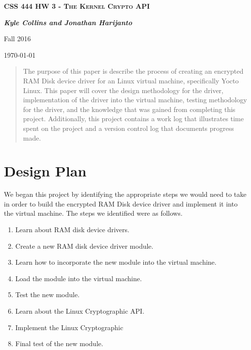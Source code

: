 \documentclass[letterpaper,10pt,draftclsnofoot,titlepage,onecolumn]{IEEEtran}
\begin{document}
	
	\begin{titlepage}
		\centering
		{\scshape\LARGE \textbf{CSS 444 HW 3 - The Kernel Crypto API}\par}
		{\LARGE\itshape \textbf{Kyle Collins and Jonathan Harijanto}\par}
		{\LARGE Fall 2016\par}
		{\LARGE \today\par}
		
	\vfill		
		
		\begin{abstract}
The purpose of this paper is describe the process of creating an encrypted RAM Disk device driver for an Linux virtual machine, specifically Yocto Linux. 
This paper will cover the design methodology for the driver, implementation of the driver into the virtual machine, testing methodology for the driver, and the knowledge that was gained from completing this project. 
Additionally, this project contains a work log that illustrates time spent on the project and a version control log that documents progress made.
 		\end{abstract}
		
	\end{titlepage}
	
	\clearpage
	\tableofcontents
	
	\clearpage
	\section{Design Plan}
	
We began this project by identifying the appropriate steps we would need to take in order to build the encrypted RAM Disk device driver and implement it into the virtual machine. 
The steps we identified were as follows.
 	 
 	 \begin{enumerate}
 	 	\item Learn about RAM disk device drivers.
 	 	\item Create a new RAM disk device driver module. 
 	 	\item Learn how to incorporate the new module into the virtual machine.
 	 	\item Load the module into the virtual machine.
 		\item Test the new module.
 	 	\item Learn about the Linux Cryptographic API.
 	 	\item Implement the Linux Cryptographic
 	 	\item Final test of the new module.
 	 \end{enumerate}
 
\end{document}
